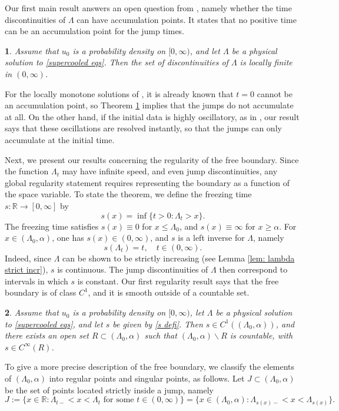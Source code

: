 \documentclass{article}
\numberwithin{equation}{section}
\numberwithin{figure}{section}
\theoremstyle{plain}
\newtheorem{thm}{\protect\theoremname}[section]
\theoremstyle{plain}
\theoremstyle{plain}
\theoremstyle{plain}
\theoremstyle{definition}
\theoremstyle{remark}
\def\R{{\mathbb{R}}}
\providecommand{\theoremname}{Theorem}
\begin{document}
Our first main result answers an open question from \cite{delarue}, namely whether the time discontinuities of $\Lambda$ can have accumulation points. It states that no positive time can be an accumulation point for the jump times. 
\begin{thm} \label{thm: jumps}Assume that $u_0$ is a probability density on $[0,\infty)$, and let $\Lambda$ be a physical solution to \eqref{supercooled eqs}. Then the set of discontinuities of $\Lambda$ is locally finite in $(0,\infty)$.    
\end{thm}
For the locally monotone solutions of \cite[Thm. 1.1]{delarue}, it is already known that $t=0$ cannot be an accumulation point, so Theorem \ref{thm: jumps} implies that the jumps do not accumulate at all. On the other hand, if the initial data is highly oscillatory, as in \cite{shkolnikov}, our result says that these oscillations are resolved instantly, so that the jumps can only accumulate at the initial time. 

Next, we present our results concerning the regularity of the free boundary. Since the function $\Lambda_t$ may have infinite speed, and even jump discontinuities, any global regularity statement requires representing the boundary as a function of the space variable. To state the theorem, we define the freezing time $s:\R \to [0,\infty]$ by
\begin{equation} \label{s defi}
    s(x)=\inf\{t>0: \Lambda_t>x\}.
\end{equation}
The freezing time satisfies $s(x)\equiv 0$ for $x\leq \Lambda_0$, and $s(x)\equiv \infty$ for $x\geq \alpha$. For $x\in (\Lambda_0,\alpha)$, one has $s(x)\in (0,\infty)$, and $s$ is a left inverse for $\Lambda$, namely
\[s(\Lambda_t)=t,\quad t\in (0,\infty).\]
Indeed, since $\Lambda$ can be shown to be strictly increasing (see Lemma \ref{lem: lambda strict incr}), $s$ is continuous. The jump discontinuities of $\Lambda$ then correspond to intervals in which $s$ is constant. Our first regularity result says that the free boundary is of class $C^1$, and it is smooth outside of a countable set.
\begin{thm}\label{thm: C1 regu} Assume that $u_0$ is a probability density on $[0,\infty)$, let $\Lambda$ be a physical solution to \eqref{supercooled eqs}, and let $s$ be given by \eqref{s defi}. Then $s\in C^{1}((\Lambda_0,\alpha))$, and there exists an open set $R \subset (\Lambda_0,\alpha)$ such that $(\Lambda_0,\alpha)\backslash R$ is countable, with $s \in C^{\infty}(R)$.
\end{thm}
To give a more precise description of the free boundary, we classify the elements of $(\Lambda_0,\alpha)$ into regular points and singular points, as follows. Let $J \subset (\Lambda_0,\alpha)$ be the set of points located strictly inside a jump, namely
\begin{equation}
J:=\{x\in \R  : \Lambda_{t-}<x<\Lambda_t \text{ for some } t\in (0,\infty) \}=\{x\in (\Lambda_0,\alpha)  : \Lambda_{s(x)-}<x<\Lambda_{s(x)} \}.
\end{equation}
\end{document}
